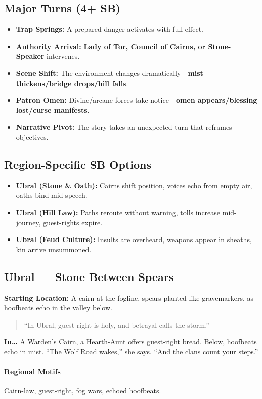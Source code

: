 \subsection*{Major Turns (4+ SB)}
\begin{itemize}
\item \textbf{Trap Springs:} A prepared danger activates with full effect.
\item \textbf{Authority Arrival:} \textbf{Lady of Tor, Council of Cairns, or Stone-Speaker} intervenes.
\item \textbf{Scene Shift:} The environment changes dramatically - \textbf{mist thickens/bridge drops/hill falls}.
\item \textbf{Patron Omen:} Divine/arcane forces take notice - \textbf{omen appears/blessing lost/curse manifests}.
\item \textbf{Narrative Pivot:} The story takes an unexpected turn that reframes objectives.
\end{itemize}

\subsection*{Region-Specific SB Options}
\begin{itemize}
\item \textbf{Ubral (Stone \& Oath):} Cairns shift position, voices echo from empty air, oaths bind mid-speech.
\item \textbf{Ubral (Hill Law):} Paths reroute without warning, tolls increase mid-journey, guest-rights expire.
\item \textbf{Ubral (Feud Culture):} Insults are overheard, weapons appear in sheaths, kin arrive unsummoned.
\end{itemize}

\subsection*{Ubral — Stone Between Spears}
\textbf{Starting Location:} A cairn at the fogline, spears planted like gravemarkers, as hoofbeats echo in the valley below.
\begin{quote}
“In Ubral, guest‑right is holy, and betrayal calls the storm.”
\end{quote}

\textbf{In…} A Warden’s Cairn, a Hearth-Aunt offers guest-right bread. Below, hoofbeats echo in mist. ``The Wolf Road wakes,'' she says. ``And the clans count your steps.''
\paragraph{Regional Motifs} Cairn-law, guest-right, fog wars, echoed hoofbeats.
